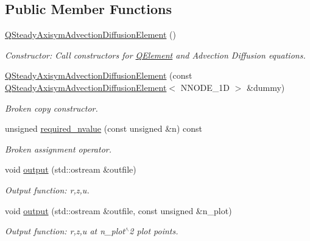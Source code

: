 \subsection*{Public Member Functions}
\begin{DoxyCompactItemize}
\item 
\hyperlink{classoomph_1_1QSteadyAxisymAdvectionDiffusionElement_ae6bf7086187387165208d76d8e4dedf1}{Q\+Steady\+Axisym\+Advection\+Diffusion\+Element} ()
\begin{DoxyCompactList}\small\item\em Constructor\+: Call constructors for \hyperlink{classoomph_1_1QElement}{Q\+Element} and Advection Diffusion equations. \end{DoxyCompactList}\item 
\hyperlink{classoomph_1_1QSteadyAxisymAdvectionDiffusionElement_a6950503ceccc90efb293e568519e5255}{Q\+Steady\+Axisym\+Advection\+Diffusion\+Element} (const \hyperlink{classoomph_1_1QSteadyAxisymAdvectionDiffusionElement}{Q\+Steady\+Axisym\+Advection\+Diffusion\+Element}$<$ N\+N\+O\+D\+E\+\_\+1D $>$ \&dummy)
\begin{DoxyCompactList}\small\item\em Broken copy constructor. \end{DoxyCompactList}\item 
unsigned \hyperlink{classoomph_1_1QSteadyAxisymAdvectionDiffusionElement_a493f0e3dc55e80f78016ae8f9c3e39cf}{required\+\_\+nvalue} (const unsigned \&n) const
\begin{DoxyCompactList}\small\item\em Broken assignment operator. \end{DoxyCompactList}\item 
void \hyperlink{classoomph_1_1QSteadyAxisymAdvectionDiffusionElement_acb9de208b63774c2ea96c1bcab916212}{output} (std\+::ostream \&outfile)
\begin{DoxyCompactList}\small\item\em Output function\+: r,z,u. \end{DoxyCompactList}\item 
void \hyperlink{classoomph_1_1QSteadyAxisymAdvectionDiffusionElement_a5dd4db916c9c81fd0f72631a2a16c915}{output} (std\+::ostream \&outfile, const unsigned \&n\+\_\+plot)
\begin{DoxyCompactList}\small\item\em Output function\+: r,z,u at n\+\_\+plot$^\wedge$2 plot points. \end{DoxyCompactList}\item 

\end{DoxyCompactItemize}

